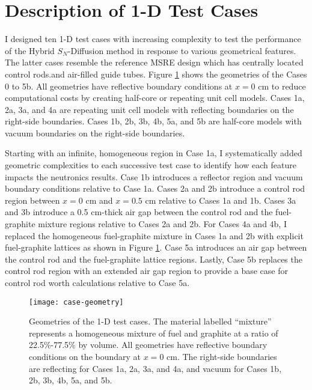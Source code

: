 \section{Description of 1-D Test Cases}

I designed ten 1-D test cases with increasing complexity to test the performance of the
Hybrid $S_N$-Diffusion method in response to various geometrical features. The latter cases
resemble the reference \gls{MSRE} design which has centrally located control rods.and air-filled
guide tubes. Figure \ref{fig:case-geom} shows the geometries of the Cases 0 to 5b.
All geometries have reflective boundary conditions at $x=0$ cm to reduce computational costs by
creating half-core or repeating unit cell models. Cases 1a, 2a, 3a, and 4a are repeating unit
cell models with reflecting boundaries on the right-side boundaries. Cases 1b, 2b, 3b, 4b, 5a, and
5b are half-core models with vacuum boundaries on the right-side boundaries.

Starting with an infinite, homogeneous region in Case 1a, I systematically added geometric
complexities to each successive test case to identify how each feature impacts the neutronics
results. Case 1b introduces a reflector region and vacuum boundary conditions relative to Case 1a.
Cases 2a and 2b introduce a control rod region between $x=0$ cm and $x=0.5$ cm relative to Cases 1a
and 1b. Cases 3a and 3b introduce a 0.5 cm-thick air gap between the control rod and the
fuel-graphite mixture regions relative to Cases 2a and 2b. For Cases 4a and 4b, I replaced the
homogeneous fuel-graphite mixture in Cases 1a and 2b with explicit fuel-graphite lattices as shown
in Figure \ref{fig:case-geom}. Case 5a introduces an air gap between the control rod and the
fuel-graphite lattice regions. Lastly, Case 5b replaces the control rod region with an extended
air gap region to provide a base case for control rod worth calculations relative to Case 5a.

\begin{figure}[htb!]
  \centering
  \texttt{[image: case-geometry]}
  \caption{Geometries of the 1-D test cases. The material labelled ``mixture'' represents a
    homogeneous mixture of fuel and graphite at a ratio of 22.5\%-77.5\% by volume. All geometries
    have reflective boundary conditions on the boundary at $x=0$ cm. The right-side boundaries are
    reflecting for Cases 1a, 2a, 3a, and 4a, and vacuum for Cases 1b, 2b, 3b, 4b, 5a, and 5b.}
  \label{fig:case-geom}
\end{figure}

